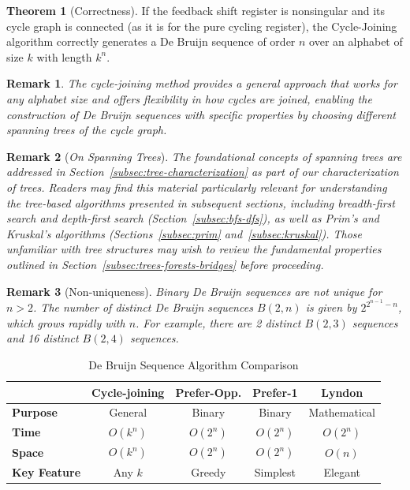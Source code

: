 \documentclass{article}
\newtheorem{remark}{Remark}
\theoremstyle{definition}
\newtheorem{theorem}{Theorem}
\begin{document}
\begin{theorem}[Correctness]
If the feedback shift register is nonsingular and its cycle graph is connected (as it is for the pure cycling register), the Cycle-Joining algorithm correctly generates a De Bruijn sequence of order $n$ over an alphabet of size $k$ with length $k^n$.
\end{theorem}

\begin{remark}
The cycle-joining method provides a general approach that works for any alphabet size and offers flexibility in how cycles are joined, enabling the construction of De Bruijn sequences with specific properties by choosing different spanning trees of the cycle graph.
\end{remark}

\begin{remark}[\textit{On Spanning Trees}]
The foundational concepts of spanning trees are addressed in Section~\ref{subsec:tree-characterization} as part of our characterization of trees. Readers may find this material particularly relevant for understanding the tree-based algorithms presented in subsequent sections, including breadth-first search and depth-first search (Section~\ref{subsec:bfs-dfs}), as well as Prim's and Kruskal's algorithms (Sections~\ref{subsec:prim} and~\ref{subsec:kruskal}). Those unfamiliar with tree structures may wish to review the fundamental properties outlined in Section~\ref{subsec:trees-forests-bridges} before proceeding.
\end{remark}


\begin{remark}[Non-uniqueness]
Binary De Bruijn sequences are not unique for $n > 2$. The number of distinct De Bruijn sequences $B(2,n)$ is given by $2^{2^{n-1}-n}$, which grows rapidly with $n$. For example, there are 2 distinct $B(2,3)$ sequences and 16 distinct $B(2,4)$ sequences.
\end{remark}

\begin{table}[htbp]
\centering
\caption{De Bruijn Sequence Algorithm Comparison}
\label{tab:debruijn_alg}
\small
\begin{tabular}{|l|c|c|c|c|}
\hline
 & \textbf{Cycle-joining} & \textbf{Prefer-Opp.} & \textbf{Prefer-1} & \textbf{Lyndon} \\
\hline
\textbf{Purpose} & General & Binary & Binary & Mathematical \\
\hline
\textbf{Time} & $O(k^n)$ & $O(2^n)$ & $O(2^n)$ & $O(2^n)$ \\
\hline
\textbf{Space} & $O(k^n)$ & $O(2^n)$ & $O(2^n)$ & $O(n)$ \\
\hline
\textbf{Key Feature} & Any $k$ & Greedy & Simplest & Elegant \\
\hline
\end{tabular}
\end{table}
\end{document}

